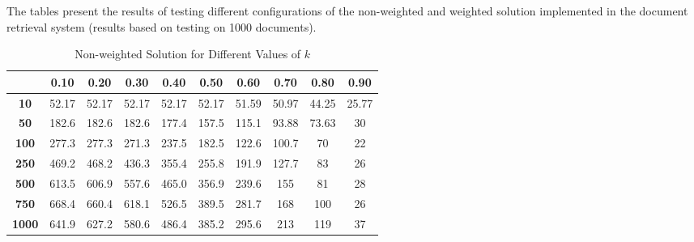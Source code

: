 \documentclass[12pt,a4paper]{article}
\begin{document}
The tables present the results of testing different configurations of the non-weighted and weighted solution implemented in the document retrieval system (results based on testing on 1000 documents).
\newpage

\begin{table}[h!]
    \centering
    \setlength{\arrayrulewidth}{0.5mm} %
    \renewcommand{\arraystretch}{1.5} %
    \begin{tabular}{|c|c|c|c|c|c|c|c|c|c|}
    \hline
    \rowcolor{black!75} %
    & \color{white}\textbf{0.10} & \color{white}\textbf{0.20} & \color{white}\textbf{0.30} & \color{white}\textbf{0.40} & \color{white}\textbf{0.50} & \color{white}\textbf{0.60} & \color{white}\textbf{0.70} & \color{white}\textbf{0.80} & \color{white}\textbf{0.90} \\ \hline
    \cellcolor{black!75}\color{white}\textbf{10} & 52.17 & 52.17 & 52.17 & 52.17 & 52.17 & 51.59 & 50.97 & 44.25 & 25.77 \\ \hline
    \cellcolor{black!75}\color{white}\textbf{50} & 182.6 & 182.6 & 182.6 & 177.4 & 157.5 & 115.1 & 93.88 & 73.63 & 30 \\ \hline
    \cellcolor{black!75}\color{white}\textbf{100} & 277.3 & 277.3 & 271.3 & 237.5 & 182.5 & 122.6 & 100.7 & 70 & 22 \\ \hline
    \cellcolor{black!75}\color{white}\textbf{250} & 469.2 & 468.2 & 436.3 & 355.4 & 255.8 & 191.9 & 127.7 & 83 & 26 \\ \hline
    \cellcolor{black!75}\color{white}\textbf{500} & 613.5 & 606.9 & 557.6 & 465.0 & 356.9 & 239.6 & 155 & 81 & 28 \\ \hline
    \cellcolor{black!75}\color{white}\textbf{750} & 668.4 & 660.4 & 618.1 & 526.5 & 389.5 & 281.7 & 168 & 100 & 26 \\ \hline
    \cellcolor{black!75}\color{white}\textbf{1000} & 641.9 & 627.2 & 580.6 & 486.4 & 385.2 & 295.6 & 213 & 119 & 37 \\ \hline
    \end{tabular}
    \caption{Non-weighted Solution for Different Values of $k$}
\end{table}
\end{document}
